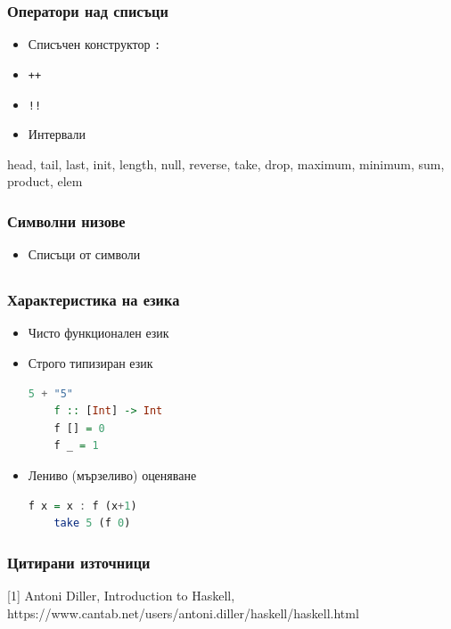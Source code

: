 \documentclass{beamer}
\begin{document}
\begin{frame}[fragile]
  \frametitle{Оператори над списъци}

  \begin{itemize}
    \item Списъчен конструктор \verb|:|
    \item \verb|++|
    \item \verb|!!|
    \item Интервали
  \end{itemize}

  \bigskip

  head, tail, last, init, length, null, reverse, take, drop, maximum, minimum, sum, product, elem

\end{frame}

\begin{frame}[fragile]
  \frametitle{Символни низове}

  \begin{itemize}
    \item Списъци от символи
  \end{itemize}

  \bigskip
  

\end{frame}



\subsection{}


\begin{frame}[fragile]
  \frametitle{Характеристика на езика}
  
\begin{itemize}
  \item Чисто функционален език
  \item Строго типизиран език
  \begin{lstlisting}[basicstyle=\small, language=Haskell]
    5 + "5"
    f :: [Int] -> Int
    f [] = 0
    f _ = 1
    \end{lstlisting}
  \item Лениво (мързеливо) оценяване
  \begin{lstlisting}[basicstyle=\small, language=Haskell]
    f x = x : f (x+1)
    take 5 (f 0)
  \end{lstlisting}
\end{itemize}


\end{frame}


\begin{frame}[fragile]
  \frametitle{Цитирани източници}

    [1] Antoni Diller, Introduction to Haskell, 
        https://www.cantab.net/users/antoni.diller/haskell/haskell.html
\end{frame}
\end{document}
